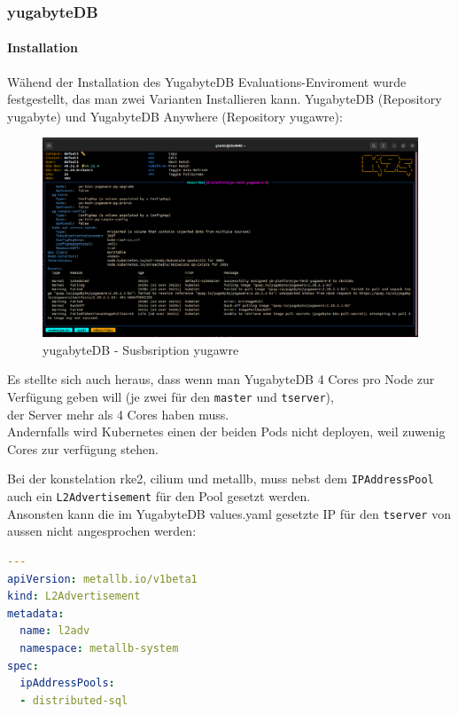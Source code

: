 
\begin{flushleft}
    \subsubsection{yugabyteDB}
    \paragraph{Installation}
    Wähend der Installation des YugabyteDB Evaluations-Enviroment wurde festgestellt, das man zwei Varianten Installieren kann.
    YugabyteDB (Repository yugabyte) und YugabyteDB Anywhere (Repository yugawre):
    \begin{figure}[H]
        \centering
        \includegraphics[width=1\linewidth]{source/implementation/evaluation/platforms/yugabytedb_pod_installation_subscription_interrup}
        \caption{yugabyteDB - Susbsription yugawre}
        \label{fig:yugabytedb_pod_installation_subscription_interrup}
    \end{figure}
\end{flushleft}
\begin{flushleft}
    Es stellte sich auch heraus, dass wenn man YugabyteDB 4 Cores pro Node zur Verfügung geben will (je zwei für den \texttt{master} und \texttt{tserver}),\\
    der Server mehr als 4 Cores haben muss.\\
    Andernfalls wird Kubernetes einen der beiden Pods nicht deployen, weil zuwenig Cores zur verfügung stehen.
\end{flushleft}
\begin{flushleft}
    Bei der konstelation rke2, cilium und metallb, muss nebst dem \texttt{IPAddressPool} auch ein \texttt{L2Advertisement} für den Pool gesetzt werden.\\
    Ansonsten kann die im YugabyteDB values.yaml gesetzte IP für den \texttt{tserver} von aussen nicht angesprochen werden:
    \lstset{style=gra_codestyle}
    \begin{lstlisting}[language=yaml, caption=metallb - Konfig YAML - Detail L2Advertisement,captionpos=b,label={lst:metallb-l2advertisement-setting},breaklines=true]
---
apiVersion: metallb.io/v1beta1
kind: L2Advertisement
metadata:
  name: l2adv
  namespace: metallb-system
spec:
  ipAddressPools:
  - distributed-sql
    \end{lstlisting}
\end{flushleft}
